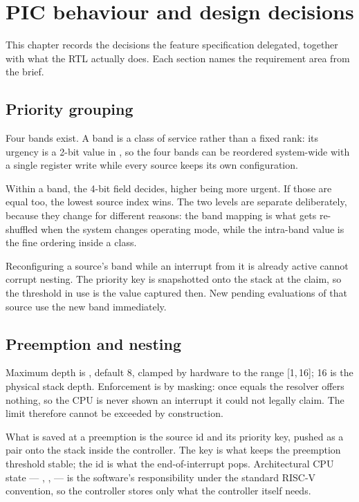 \chapter{PIC behaviour and design decisions}
\label{ch:picbehav}

This chapter records the decisions the feature specification delegated, together
with what the RTL actually does. Each section names the requirement area from the
brief.

\section{Priority grouping}

Four bands exist. A band is a class of service rather than a fixed rank: its
urgency is a 2-bit value in , so the four bands can be
reordered system-wide with a single register write while every source keeps its
own configuration.

Within a band, the 4-bit  field decides, higher being more urgent. If
those are equal too, the lowest source index wins. The two levels are separate
deliberately, because they change for different reasons: the band mapping is what
gets re-shuffled when the system changes operating mode, while the intra-band
value is the fine ordering inside a class.

Reconfiguring a source's band while an interrupt from it is already active cannot
corrupt nesting. The priority key is snapshotted onto the stack at the claim, so
the threshold in use is the value captured then. New pending evaluations of that
source use the new band immediately.

\section{Preemption and nesting}

Maximum depth is , default 8, clamped by hardware to the range
[1,\,16]; 16 is the physical stack depth. Enforcement is by masking: once
 equals  the resolver offers nothing, so the CPU is
never shown an interrupt it could not legally claim. The limit therefore cannot
be exceeded by construction.

What is saved at a preemption is the source id and its priority key, pushed as a
pair onto the stack inside the controller. The key is what keeps the preemption
threshold stable; the id is what the end-of-interrupt pops. Architectural CPU
state --- , ,  --- is the software's
responsibility under the standard RISC-V convention, so the controller stores
only what the controller itself needs.

